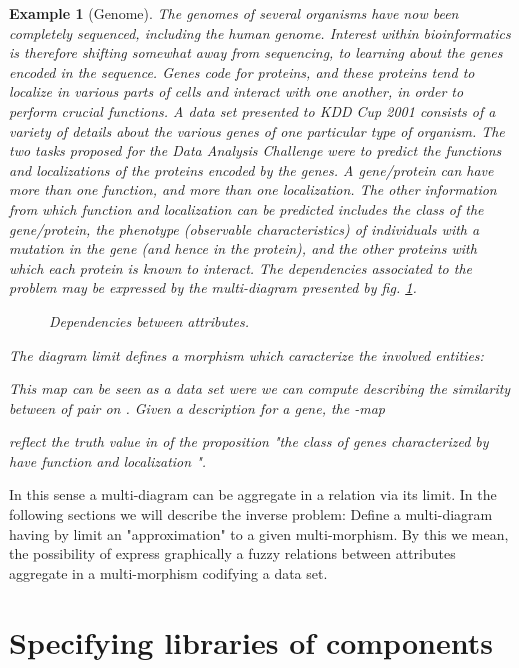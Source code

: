 \documentclass[oribibl]{llncs}
\newtheorem{exam}{Example}
\begin{document}
\begin{exam}[Genome]
The genomes of several organisms have now been completely sequenced, including
the human genome.  Interest within bioinformatics is therefore shifting somewhat away from sequencing, to learning about the genes encoded in the sequence.  Genes code for proteins, and these proteins tend to localize in various parts of cells and interact with one another, in order to perform crucial functions.  A data set presented to KDD Cup 2001 consists of
a variety of details about the various genes of one particular type of organism.
The two tasks proposed for the Data Analysis
Challenge were to predict the functions and localizations of the
proteins encoded by the genes.  A gene/protein can have more than one function,
and more than one localization.  The other information from
which function and localization can be predicted includes the class of the
gene/protein, the phenotype (observable characteristics) of individuals with a
mutation in the gene (and hence in the protein), and the other proteins with
which each protein is known to interact. The dependencies associated to the problem may be expressed by the multi-diagram  presented by fig. \ref{genomeattrib}.
\begin{figure}[h]

\caption{Dependencies between attributes.}\label{genomeattrib}
\end{figure}
The diagram limit defines a morphism which caracterize the involved entities:


This map can be seen as a data set were we can compute  describing the similarity between of pair on . Given a description  for a gene, the -map

reflect the truth value in  of the proposition "the class of genes characterized by   have function  and localization ".
\end{exam}
In this sense a multi-diagram can be aggregate in a relation via its limit. In the following sections we will describe the inverse problem: Define a multi-diagram having by limit an "approximation" to a given multi-morphism. By this we mean, the possibility of express graphically a fuzzy relations between attributes aggregate in a multi-morphism codifying a data set.

\section{Specifying libraries of components}\label{specifying libraries}
\end{document}
